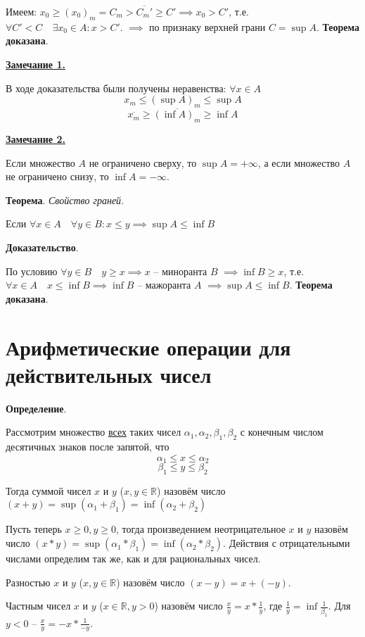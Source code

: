 \documentclass{article}
\begin{document}
Имеем: $x_0 \ge (x_0)_m = C_m > \overline{C_m'} \ge C' \implies x_0 > C'$,
т.е. $\forall C' < C \quad \exists x_0 \in A: x > C'$.
$\implies$ по признаку верхней грани $C = \sup A$. \textbf{Теорема доказана}.

\underline{\textbf{Замечание 1.}}

В ходе доказательства были получены неравенства: $\forall x \in A$
\[x_m \le (\sup A)_m \le \sup A\]
\[\overline{x_m} \ge \overline{(\inf A)_m} \ge \inf A\]

\underline{\textbf{Замечание 2.}}

Если множество $A$ не ограничено сверху, то $\sup A = + \infty$, а если множество $A$
не ограничено снизу, то $\inf A = - \infty$.

\textbf{Теорема}. \textit{Свойство граней}.

Если $\forall x \in A \quad \forall y \in B: x \le y \implies \sup A \le \inf B$

\textbf{Доказательство}.

По условию $\forall y \in B \quad y \ge x \implies x$ -- миноранта $B$
$\implies \inf B \ge x$, т.е. $\forall x \in A \quad x \le \inf B \implies \inf B$ --
мажоранта $A$ $\implies \sup A \le \inf B$. \textbf{Теорема доказана}.

\section{Арифметические операции для действительных чисел}

\textbf{Определение}.

Рассмотрим множество \underline{всех} таких чисел
$\alpha_1, \alpha_2, \beta_1, \beta_2$ с конечным числом десятичных знаков
после запятой, что
\[\alpha_1 \le x \le \alpha_2\]
\[\beta_1 \le y \le \beta_2\]

Тогда суммой чисел $x$ и $y$ ($x, y \in \mathbb{R}$) назовём число 
$(x + y) = \sup (\alpha_1 + \beta_1) = \inf (\alpha_2 + \beta_2)$

Пусть теперь $x \ge 0, y \ge 0$, тогда произведением неотрицательное $x$ и $y$
назовём число $(x * y) = \sup (\alpha_1 * \beta_1) = \inf (\alpha_2 * \beta_2)$.
Действия с отрицательными числами определим так же, как и для рациональных чисел.

Разностью $x$ и $y$ ($x, y \in \mathbb{R}$) назовём число $(x - y) = x + (-y)$.

Частным чисел $x$ и $y$ ($x \in \mathbb{R}, y > 0$) назовём число 
$\frac{x}{y} = x * \frac{1}{y}$, где $\frac{1}{y} = \inf \frac{1}{\beta_1}$.
Для $y < 0$ -- $\frac{x}{y} = -x * \frac{1}{-y}$.
\end{document}
